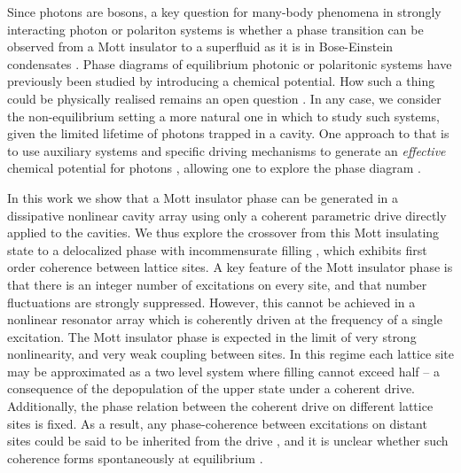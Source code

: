 Since photons are bosons, a key question for many-body phenomena in strongly interacting photon or polariton systems is whether a phase transition can be observed from a Mott insulator to a superfluid \cite{Hartmann2007} as it is in Bose-Einstein condensates \cite{Fisher1989,Jaksch1998,Greiner2002}. Phase diagrams of equilibrium photonic or polaritonic systems have previously been studied by introducing a chemical potential. How such a thing could be physically realised remains an open question \cite{Greentree2006,Koch2009,DeLeeuw2015,Hartmann2016}. In any case, we consider the non-equilibrium setting a more natural one in which to study such systems, given the limited lifetime of photons trapped in a cavity. One approach to that is to use auxiliary systems and specific driving mechanisms to generate an \emph{effective} chemical potential for photons \cite{Hafezi2015,Ma2017,Lebreuilly2017}, allowing one to explore the phase diagram \cite{Biella2017}.

In this work we show that a Mott insulator phase can be generated in a dissipative nonlinear cavity array using only a coherent parametric drive directly applied to the cavities. We thus explore the crossover from this Mott insulating state to a delocalized phase with incommensurate filling \cite{Hartmann2010,LeBoite2013,Jin2013,Abbarchi2013,Raftery2014,Altman2015,Dagvadorj2015}, which exhibits first order coherence between lattice sites. A key feature of the Mott insulator phase is that there is an integer number of excitations on every site, and that number fluctuations are strongly suppressed. However, this cannot be achieved in a nonlinear resonator array which is coherently driven at the frequency of a single excitation. The Mott insulator phase is expected in the limit of very strong nonlinearity, and very weak coupling between sites. In this regime each lattice site may be approximated as a two level system where filling cannot exceed half -- a consequence of the depopulation of the upper state under a coherent drive. Additionally, the phase relation between the coherent drive on different lattice sites is fixed. As a result, any phase-coherence between excitations on distant sites could be said to be inherited from the drive \cite{Ruiz-Rivas2014}, and it is unclear whether such coherence forms spontaneously at equilibrium \cite{Fisher1989,Jaksch1998,Greiner2002}.

